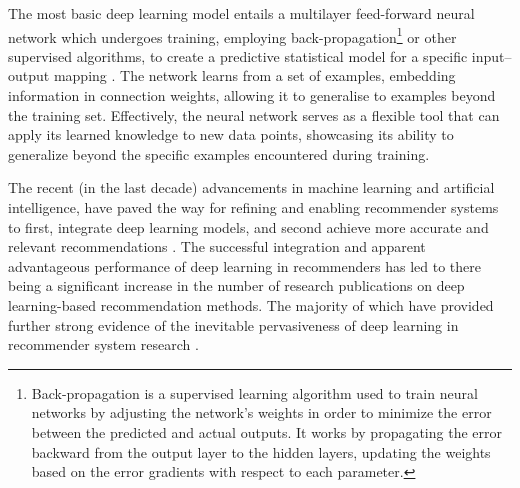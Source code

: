 The most basic deep learning model entails a multilayer feed-forward neural network which undergoes training, employing back-propagation\footnote{Back-propagation is a supervised learning algorithm used to train neural networks by adjusting the network's weights in order to minimize the error between the predicted and actual outputs. It works by propagating the error backward from the output layer to the hidden layers, updating the weights based on the error gradients with respect to each parameter.} or other supervised algorithms, to create a predictive statistical model for a specific input–output mapping \cite{zhang2019deep}. The network learns from a set of examples, embedding information in connection weights, allowing it to generalise to examples beyond the training set. Effectively, the neural network serves as a flexible tool that can apply its learned knowledge to new data points, showcasing its ability to generalize beyond the specific examples encountered during training.

The recent (in the last decade) advancements in machine learning and artificial intelligence, have paved the way for refining and enabling recommender systems to first, integrate deep learning models, and second achieve more accurate and relevant recommendations \cite{he2017neural}. The successful integration and apparent advantageous performance of deep learning in recommenders has led to there being a significant increase in the number of research publications on deep learning-based recommendation methods. The majority of which have provided further strong evidence of the inevitable pervasiveness of deep learning in recommender system research \cite{zhang2019deep}.

